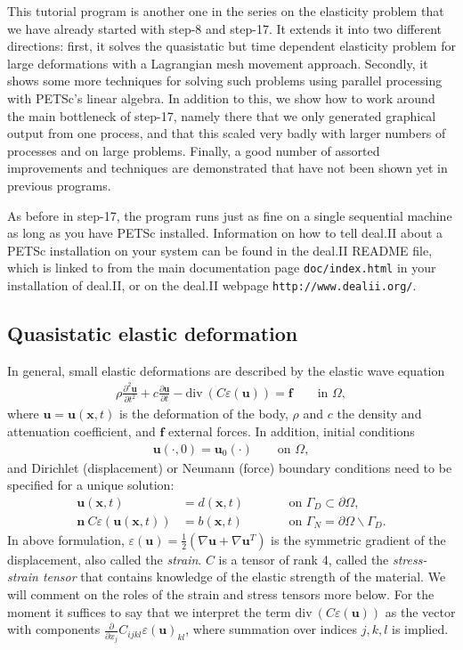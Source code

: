 \documentclass{article}
\renewcommand{\vec}[1]{\mathbf{#1}}
\renewcommand{\div}{\mathrm{div}\ }
\begin{document}
This tutorial program is another one in the series on the elasticity problem
that we have already started with step-8 and step-17. It extends it into two
different directions: first, it solves the quasistatic but time dependent
elasticity problem for large deformations with a Lagrangian mesh movement
approach. Secondly, it shows some more techniques for solving such problems
using parallel processing with PETSc's linear algebra. In addition to this, we
show how to work around the main bottleneck of step-17, namely there that we
only generated graphical output from one process, and that this scaled very
badly with larger numbers of processes and on large problems. Finally, a good
number of assorted improvements and techniques are demonstrated that have not
been shown yet in previous programs.

As before in step-17, the program runs just as fine on a single sequential
machine as long as you have PETSc installed. Information on how to tell
deal.II about a PETSc installation on your system can be found in the deal.II
README file, which is linked to from the main documentation page
\texttt{doc/index.html} in your installation of deal.II, or on the deal.II
webpage \texttt{http://www.dealii.org/}.


\subsection*{Quasistatic elastic deformation}

In general, small elastic deformations are described by the elastic wave
equation
\begin{gather*}
  \rho \frac{\partial^2 \vec u}{\partial t^2} 
  + c \frac{\partial \vec u}{\partial t}
  - \div ( C \varepsilon(\vec u)) = \vec f
  \qquad
  \text{in $\Omega$},
\end{gather*}
where $\vec u=\vec u (\vec x,t)$ is the deformation of the body, $\rho$ and
$c$ the density and attenuation coefficient, and $\vec f$ external forces. In
addition, initial conditions
\begin{align*}
  \vec u(\cdot, 0) = \vec u_0(\cdot)
  \qquad
  \text{on $\Omega$},
\end{align*}
and Dirichlet (displacement) or Neumann (force) boundary conditions need
to be specified for a unique solution:
\begin{align*}
  \vec u(\vec x,t) &= d(\vec x,t)
  \qquad
  &&\text{on $\Gamma_D\subset\partial\Omega$},  
  \\
  \vec n \ C \varepsilon(\vec u(\vec x,t)) &= b(\vec x,t)
  \qquad
  &&\text{on $\Gamma_N=\partial\Omega\backslash\Gamma_D$}.
\end{align*}
In above formulation, $\varepsilon(\vec u)= \tfrac 12 (\nabla \vec u + \nabla
\vec u^T)$ is the symmetric gradient of the displacement, also called the
\textit{strain}. $C$ is a tensor of rank 4, called the \textit{stress-strain
  tensor} that contains knowledge of the elastic strength of the material. We
will comment on the roles of the strain and stress tensors more below. For the
moment it suffices to say that we interpret the term $\div ( C
\varepsilon(\vec u))$ as the vector with components $\tfrac \partial{\partial
  x_j} C_{ijkl} \varepsilon(\vec u)_{kl}$, where summation over indices
$j,k,l$ is implied.
\end{document}
